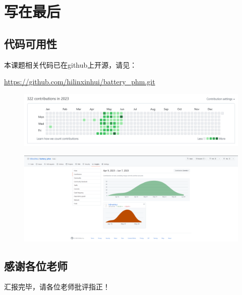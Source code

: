 \documentclass{beamer}
\begin{document}
\section{写在最后}

\subsection{代码可用性}

\begin{frame}
	\centering
	本课题相关代码已在github上开源，请见：

	\centering
	\url {https://github.com/hilinxinhui/battery_phm.git}

	\begin{figure}[htbp]
		\centering
		\includegraphics[scale=0.35]{figures/github_contribution_log.png}
	\end{figure}

	\begin{figure}[htbp]
		\centering
		\includegraphics[scale=0.15]{figures/github_contribution_log_2.png}
	\end{figure}

\end{frame}

\subsection{感谢各位老师}

\begin{frame}
	\LARGE \centering 汇报完毕，请各位老师批评指正！
\end{frame}
\end{document}
